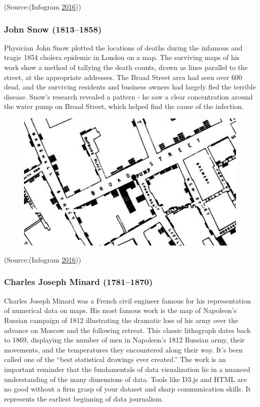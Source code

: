 \documentclass[]{book}
\theoremstyle{definition}
\theoremstyle{definition}
\theoremstyle{definition}
\theoremstyle{remark}
\begin{document}
(Source:(Infogram \protect\hyperlink{ref-history_viz}{2016}))

\subsubsection{John Snow (1813--1858)}\label{john-snow-18131858-1}

Physician John Snow plotted the locations of deaths during the infamous
and tragic 1854 cholera epidemic in London on a map. The surviving maps
of his work show a method of tallying the death counts, drawn as lines
parallel to the street, at the appropriate addresses. The Broad Street
area had seen over 600 dead, and the surviving residents and business
owners had largely fled the terrible disease. Snow's research revealed a
pattern - he saw a clear concentration around the water pump on Broad
Street, which helped find the cause of the infection.

\begin{figure}
\centering
\includegraphics{images/Snow.png}
\caption{}
\end{figure}

(Source:(Infogram \protect\hyperlink{ref-history_viz}{2016}))

\subsubsection{Charles Joseph Minard
(1781--1870)}\label{charles-joseph-minard-17811870-1}

Charles Joseph Minard was a French civil engineer famous for his
representation of numerical data on maps. His most famous work is the
map of Napoleon's Russian campaign of 1812 illustrating the dramatic
loss of his army over the advance on Moscow and the following retreat.
This classic lithograph dates back to 1869, displaying the number of men
in Napoleon's 1812 Russian army, their movements, and the temperatures
they encountered along their way. It's been called one of the ``best
statistical drawings ever created.'' The work is an important reminder
that the fundamentals of data visualization lie in a nuanced
understanding of the many dimensions of data. Tools like D3.js and HTML
are no good without a firm grasp of your dataset and sharp communication
skills. It represents the earliest beginning of data journalism.
\end{document}
